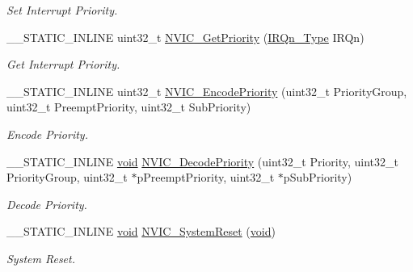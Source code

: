 \begin{DoxyCompactItemize}
\begin{DoxyCompactList}\small\item\em Set Interrupt Priority. \end{DoxyCompactList}\item 
\-\_\-\-\_\-\-S\-T\-A\-T\-I\-C\-\_\-\-I\-N\-L\-I\-N\-E uint32\-\_\-t \hyperlink{group__CMSIS__Core__NVICFunctions_ga1cbaf8e6abd4aa4885828e7f24fcfeb4}{N\-V\-I\-C\-\_\-\-Get\-Priority} (\hyperlink{group__CMSIS__175X__6X__IRQ_gaaaeafe7bd8401a46d55e8431b6326116}{I\-R\-Qn\-\_\-\-Type} I\-R\-Qn)
\begin{DoxyCompactList}\small\item\em Get Interrupt Priority. \end{DoxyCompactList}\item 
\-\_\-\-\_\-\-S\-T\-A\-T\-I\-C\-\_\-\-I\-N\-L\-I\-N\-E uint32\-\_\-t \hyperlink{group__CMSIS__Core__NVICFunctions_gadb94ac5d892b376e4f3555ae0418ebac}{N\-V\-I\-C\-\_\-\-Encode\-Priority} (uint32\-\_\-t Priority\-Group, uint32\-\_\-t Preempt\-Priority, uint32\-\_\-t Sub\-Priority)
\begin{DoxyCompactList}\small\item\em Encode Priority. \end{DoxyCompactList}\item 
\-\_\-\-\_\-\-S\-T\-A\-T\-I\-C\-\_\-\-I\-N\-L\-I\-N\-E \hyperlink{Paradigm_2Tern__EE_2small_2portmacro_8h_a14d32f8130d3c0b212cfc751730b5b49}{void} \hyperlink{group__CMSIS__Core__NVICFunctions_ga4f23ef94633f75d3c97670a53949003c}{N\-V\-I\-C\-\_\-\-Decode\-Priority} (uint32\-\_\-t Priority, uint32\-\_\-t Priority\-Group, uint32\-\_\-t $\ast$p\-Preempt\-Priority, uint32\-\_\-t $\ast$p\-Sub\-Priority)
\begin{DoxyCompactList}\small\item\em Decode Priority. \end{DoxyCompactList}\item 
\-\_\-\-\_\-\-S\-T\-A\-T\-I\-C\-\_\-\-I\-N\-L\-I\-N\-E \hyperlink{Paradigm_2Tern__EE_2small_2portmacro_8h_a14d32f8130d3c0b212cfc751730b5b49}{void} \hyperlink{group__CMSIS__Core__NVICFunctions_ga1143dec48d60a3d6f238c4798a87759c}{N\-V\-I\-C\-\_\-\-System\-Reset} (\hyperlink{Paradigm_2Tern__EE_2small_2portmacro_8h_a14d32f8130d3c0b212cfc751730b5b49}{void})
\begin{DoxyCompactList}\small\item\em System Reset. \end{DoxyCompactList}\end{DoxyCompactItemize}


